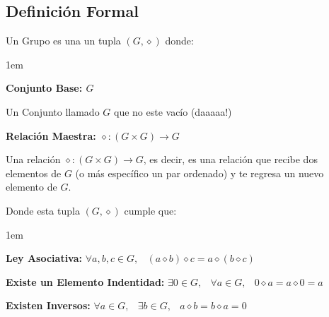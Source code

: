 \documentclass[12pt, fleqn]{report}                             %
\newenvironment{Indentation}[1][0.75em]                         %
    {\begin{adjustwidth}{#1}{}}                                     %
    {\end{adjustwidth}}                                             %
\DeclareMathOperator \Space {\quad}                             %
\DeclareMathOperator \MiniSpace {\;}                            %
\begin{document}
            \subsection{Definición Formal}

                Un Grupo es una un tupla $(G, \diamond)$ donde:
                \begin{Indentation}[1em]
                \begin{itemize}
                \small{
                    
                    \item
                        \textbf{Conjunto Base: $G$}

                        Un Conjunto llamado $G$ que no este vacío (daaaaa!)

                    \item
                        \textbf{Relación Maestra: $\diamond: (G \times  G) \to G$}

                        Una relación $\diamond: (G \times  G) \to G$, es decir, es una relación
                        que recibe dos elementos de $G$ (o más específico un par ordenado) y te
                        regresa un nuevo elemento de $G$.
                }
                \end{itemize}
                \end{Indentation}


                Donde esta tupla $(G, \diamond)$ cumple que:
                \begin{Indentation}[1em]
                \begin{itemize}
                \small{
                    
                    \item 
                        \textbf{Ley Asociativa:}
                        $\forall a, b, c \in G, \MiniSpace
                            (a \diamond b) \diamond c = a \diamond (b \diamond c)$

                    \item 
                        \textbf{Existe un Elemento Indentidad:}
                        $\exists 0 \in G, \MiniSpace
                            \forall a \in G, \MiniSpace 0 \diamond a = a \diamond 0 = a$

                    \item 
                        \textbf{Existen Inversos:}
                        $\forall a \in G, \MiniSpace
                                \exists b \in G, \MiniSpace
                                    a \diamond b = b \diamond a = 0$

                }
                \end{itemize}
                \end{Indentation}
\end{document}
